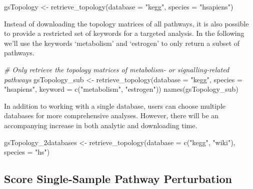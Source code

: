 \documentclass[9pt,a4paper,]{extarticle}
\newenvironment{Shaded}{\begin{snugshade}}{\end{snugshade}}
\newcommand{\AttributeTok}[1]{\textcolor[rgb]{0.77,0.63,0.00}{#1}}
\newcommand{\CommentTok}[1]{\textcolor[rgb]{0.56,0.35,0.01}{\textit{#1}}}
\newcommand{\FunctionTok}[1]{\textcolor[rgb]{0.00,0.00,0.00}{#1}}
\newcommand{\NormalTok}[1]{#1}
\newcommand{\OtherTok}[1]{\textcolor[rgb]{0.56,0.35,0.01}{#1}}
\newcommand{\StringTok}[1]{\textcolor[rgb]{0.31,0.60,0.02}{#1}}
\begin{document}
\begin{Shaded}
\begin{Highlighting}[]
\NormalTok{gsTopology }\OtherTok{\textless{}{-}} \FunctionTok{retrieve\_topology}\NormalTok{(}\AttributeTok{database =} \StringTok{"kegg"}\NormalTok{, }\AttributeTok{species =} \StringTok{"hsapiens"}\NormalTok{)}
\end{Highlighting}
\end{Shaded}

Instead of downloading the topology matrices of all pathways, it is also possible to provide a restricted set of keywords for a targeted analysis.
In the following we'll use the keywords `metabolism' and `estrogen' to only return a subset of pathways.

\begin{Shaded}
\begin{Highlighting}[]
\CommentTok{\# Only retrieve the topology matrices of metabolism{-} or signalling{-}related pathways}
\NormalTok{gsTopology\_sub }\OtherTok{\textless{}{-}} \FunctionTok{retrieve\_topology}\NormalTok{(}\AttributeTok{database =} \StringTok{"kegg"}\NormalTok{, }\AttributeTok{species =} \StringTok{"hsapiens"}\NormalTok{, }
                                    \AttributeTok{keyword =} \FunctionTok{c}\NormalTok{(}\StringTok{"metabolism"}\NormalTok{, }\StringTok{"estrogen"}\NormalTok{))}
\FunctionTok{names}\NormalTok{(gsTopology\_sub)}
\end{Highlighting}
\end{Shaded}

In addition to working with a single database, users can choose multiple databases for more comprehensive analyses.
However, there will be an accompanying increase in both analytic and downloading time.

\begin{Shaded}
\begin{Highlighting}[]
\NormalTok{gsTopology\_2databases }\OtherTok{\textless{}{-}} \FunctionTok{retrieve\_topology}\NormalTok{(}\AttributeTok{database =} \FunctionTok{c}\NormalTok{(}\StringTok{"kegg"}\NormalTok{, }\StringTok{"wiki"}\NormalTok{), }
                                           \AttributeTok{species =} \StringTok{"hs"}\NormalTok{)}
\end{Highlighting}
\end{Shaded}

\hypertarget{score-single-sample-pathway-perturbation}{%
\subsection{Score Single-Sample Pathway Perturbation}\label{score-single-sample-pathway-perturbation}}
\end{document}

